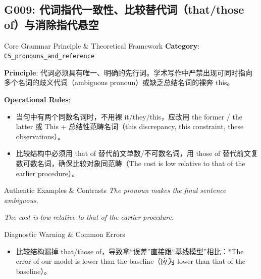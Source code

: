 \subsection{G009: 代词指代一致性、比较替代词（that/those of）与消除指代悬空}\label{sec:rule:G009}
\begin{ConceptBox}{Core Grammar Principle \& Theoretical Framework}
\textbf{Category}: \texttt{C5\_pronouns\_and\_reference}\par\vspace{3pt}
\textbf{Principle}: 代词必须具有唯一、明确的先行词。学术写作中严禁出现可同时指向多个名词的歧义代词（ambiguous pronoun）或缺乏总结名词的裸奔 this。\par\vspace{4pt}
\textbf{Operational Rules}:
\begin{itemize}[leftmargin=1.5em, itemsep=1pt]
  \item 当句中有两个同数名词时，不用裸 it/they/this，应改用 the former / the latter 或 This + 总结性范畴名词（this discrepancy, this constraint, these observations）。
  \item 比较结构中必须用 that of 替代前文单数/不可数名词，用 those of 替代前文复数可数名词，确保比较对象同范畴（The cost is low relative to that of the earlier procedure）。
\end{itemize}
\end{ConceptBox}
\begin{ExampleBox}{Authentic Examples \& Contrasts}
\textit{The pronoun makes the final sentence ambiguous.}\par\vspace{2pt}
\textit{The cost is low relative to that of the earlier procedure.}\par\vspace{2pt}
\end{ExampleBox}
\begin{TipBox}{Diagnostic Warning \& Common Errors}
\begin{itemize}[leftmargin=1.5em, itemsep=1pt]
  \item 比较结构漏掉 that/those of，导致拿“误差”直接跟“基线模型”相比：*The error of our model is lower than the baseline（应为 lower than that of the baseline）。
\end{itemize}
\end{TipBox}
\vspace{6pt}
